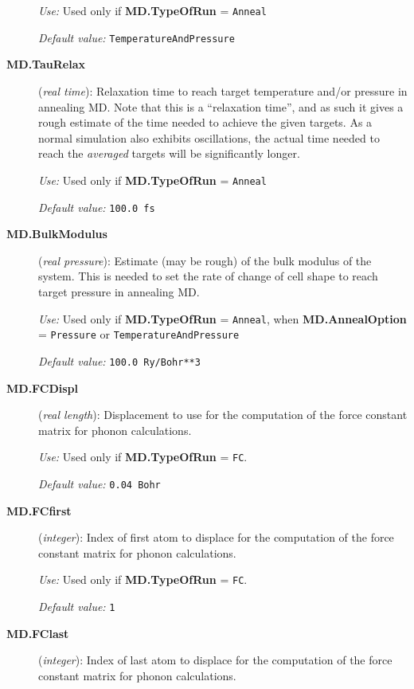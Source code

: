 \documentclass[11pt]{article}
\begin{document}
\begin{description}
{\it Use:} Used only if {\bf MD.TypeOfRun} = {\tt Anneal}

{\it Default value:} {\tt TemperatureAndPressure}

\item[{\bf MD.TauRelax}] ({\it real time}): 
Relaxation time to reach target temperature
and/or pressure in annealing MD. Note that this is a ``relaxation
time'', and as such it gives a rough estimate of the time needed to
achieve the given targets. As a normal simulation also exhibits
oscillations, the actual time needed to reach the {\it averaged}
targets will be significantly longer.

{\it Use:} Used only if {\bf MD.TypeOfRun} = {\tt Anneal}

{\it Default value:} {\tt 100.0 fs}

\item[{\bf MD.BulkModulus}] ({\it real pressure}): 
Estimate (may be rough) of the bulk modulus of the system.
This is needed to set the rate of change of cell shape
to reach target pressure in annealing MD.

{\it Use:} Used only if {\bf MD.TypeOfRun} = {\tt Anneal}, when
{\bf MD.AnnealOption} = {\tt Pressure} or {\tt TemperatureAndPressure}

{\it Default value:}  {\tt 100.0 Ry/Bohr**3}
        
\item[{\bf MD.FCDispl}] ({\it real length}): 
Displacement to use for the computation of the force constant
matrix for phonon calculations.

{\it Use:} Used only if {\bf MD.TypeOfRun} = {\tt FC}.

{\it Default value:}  {\tt 0.04 Bohr}

\item[{\bf MD.FCfirst}] ({\it integer}): 
Index of first atom to displace for the computation of the force constant
matrix for phonon calculations.

{\it Use:} Used only if {\bf MD.TypeOfRun} = {\tt FC}.

{\it Default value:}  {\tt 1}

\item[{\bf MD.FClast}] ({\it integer}): 
Index of last atom to displace for the computation of the force constant
matrix for phonon calculations.


\end{description}
\end{document}
